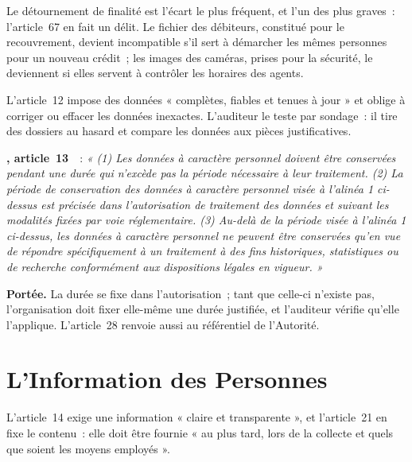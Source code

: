 Le détournement de finalité est l'écart le plus fréquent, et l'un des plus
graves~: l'article~67 en fait un délit. Le fichier des débiteurs, constitué
pour le recouvrement, devient incompatible s'il sert à démarcher les mêmes
personnes pour un nouveau crédit~; les images des caméras, prises pour la
sécurité, le deviennent si elles servent à contrôler les horaires des
agents.

L'article~12 impose des données « complètes, fiables et tenues à jour » et
oblige à corriger ou effacer les données inexactes. L'auditeur le teste par
sondage~: il tire des dossiers au hasard et compare les données aux pièces
justificatives.

\begin{boxjuris}
\textbf{, article~13}~\cite{loi2024017}~:
\textit{« (1) Les données à caractère personnel doivent être conservées
pendant une durée qui n'excède pas la période nécessaire à leur traitement.
(2) La période de conservation des données à caractère personnel visée à
l'alinéa 1 ci-dessus est précisée dans l'autorisation de traitement des
données et suivant les modalités fixées par voie réglementaire. (3) Au-delà
de la période visée à l'alinéa 1 ci-dessus, les données à caractère
personnel ne peuvent être conservées qu'en vue de répondre spécifiquement à
un traitement à des fins historiques, statistiques ou de recherche
conformément aux dispositions légales en vigueur. »}

\smallskip
\textbf{Portée.} La durée se fixe dans l'autorisation~; tant que celle-ci
n'existe pas, l'organisation doit fixer elle-même une durée justifiée, et
l'auditeur vérifie qu'elle l'applique. L'article~28 renvoie aussi au
référentiel de l'Autorité.
\end{boxjuris}

\section{L'Information des Personnes}
\label{sec:c02-information}

L'article~14 exige une information « claire et transparente », et
l'article~21 en fixe le contenu~: elle doit être fournie « au plus tard, lors
de la collecte et quels que soient les moyens employés ».

